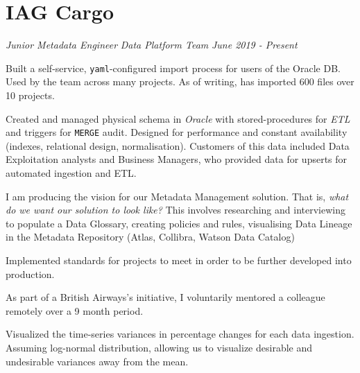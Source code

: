 \documentclass[../cv.tex]{subfiles}
\begin{document}
\section{IAG Cargo}
\textit{Junior Metadata Engineer}
\hfill
\textit{Data Platform Team}
\hfill
\textit{June 2019 - Present}
\begin{description}[style=multiline, leftmargin=3.5cm]
	\item[Self-Service Import Process\\\textnormal{Python, Powershell}]
		Built a self-service, \texttt{yaml}-configured import process for users of the Oracle DB. Used by the team across many projects. As of writing, has imported 600 files over 10 projects. \\
	\item[Sales Schema \textnormal{Oracle}] Created and managed physical schema in \textit{Oracle} with stored-procedures for \textit{ETL} and triggers for \texttt{MERGE} audit. Designed for performance and constant availability (indexes, relational design, normalisation). Customers of this data included Data Exploitation analysts and Business Managers, who provided data for upserts for automated ingestion and ETL.
	\item[Metadata Management] I am producing the vision for our Metadata Management solution. That is, \textit{what do we want our solution to look like?} This involves researching and interviewing to populate a Data Glossary, creating policies and rules, visualising  Data Lineage in the Metadata Repository (Atlas, Collibra, Watson Data Catalog)
	\item[Data Standards] Implemented standards for projects to meet in order to be further developed into production. 
	\item[Mentoring \textnormal{moving-ahead.org}] As part of a British Airways's initiative, I voluntarily mentored a colleague remotely over a 9 month period.
	\item[Vizualizations\\\textnormal{Tableau}] Visualized the time-series variances in percentage changes for each data ingestion. Assuming log-normal distribution, allowing us to visualize desirable and undesirable variances away from the mean.\\\\\
\end{description}
\end{document}
